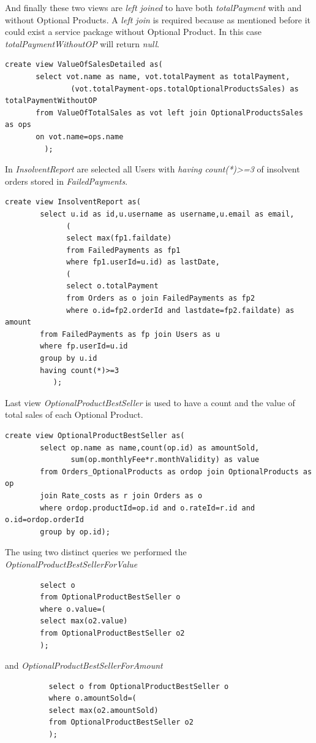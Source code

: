 \documentclass{article}
\begin{document}
And finally these two views are \emph{left joined} to have both \emph{totalPayment} with and without Optional Products. A \emph{left join} is required because as mentioned before it could exist a service package without Optional Product. In this case \emph{totalPaymentWithoutOP} will return \emph{null}.
\begin{lstlisting}
create view ValueOfSalesDetailed as(
       select vot.name as name, vot.totalPayment as totalPayment, 
               (vot.totalPayment-ops.totalOptionalProductsSales) as totalPaymentWithoutOP
       from ValueOfTotalSales as vot left join OptionalProductsSales as ops
       on vot.name=ops.name
         );
\end{lstlisting}                                     


In \emph{InsolventReport} are selected all Users with \emph{having count(*)>=3} of insolvent orders stored in \emph{FailedPayments}.
\begin{lstlisting}
create view InsolventReport as(
        select u.id as id,u.username as username,u.email as email,
              (
              select max(fp1.faildate) 
              from FailedPayments as fp1  
              where fp1.userId=u.id) as lastDate,
              (
              select o.totalPayment 
              from Orders as o join FailedPayments as fp2 
              where o.id=fp2.orderId and lastdate=fp2.faildate) as amount
        from FailedPayments as fp join Users as u
        where fp.userId=u.id
        group by u.id
        having count(*)>=3
           );
\end{lstlisting}

Last view  \emph{OptionalProductBestSeller} is used to have a count and the value of total sales of each Optional Product.
\begin{lstlisting}
create view OptionalProductBestSeller as(
        select op.name as name,count(op.id) as amountSold, 
               sum(op.monthlyFee*r.monthValidity) as value
        from Orders_OptionalProducts as ordop join OptionalProducts as op 
        join Rate_costs as r join Orders as o
        where ordop.productId=op.id and o.rateId=r.id and o.id=ordop.orderId
        group by op.id);
\end{lstlisting}
The using two distinct queries we performed the  \emph{OptionalProductBestSellerForValue}
\begin{lstlisting}
        select o 
        from OptionalProductBestSeller o 
        where o.value=(
        select max(o2.value) 
        from OptionalProductBestSeller o2
        );
\end{lstlisting}
and  \emph{OptionalProductBestSellerForAmount}
\begin{lstlisting}
          select o from OptionalProductBestSeller o 
          where o.amountSold=(
          select max(o2.amountSold) 
          from OptionalProductBestSeller o2
          );
\end{lstlisting}
\newpage
\end{document}
